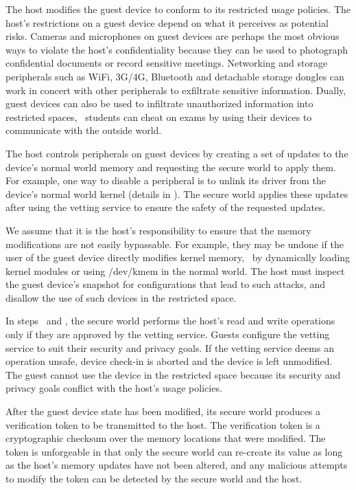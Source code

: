 \begin{mylist}
\item {} The host modifies the guest
device to conform to its restricted usage policies.  The host's restrictions on
a guest device depend on what it perceives as potential risks.  Cameras and
microphones on guest devices are perhaps the most obvious ways to violate the
host's confidentiality because they can be used to photograph confidential
documents or record sensitive meetings. Networking and storage peripherals such
as WiFi, 3G/4G, Bluetooth and detachable storage dongles can work in concert
with other peripherals to exfiltrate sensitive information. Dually, guest
devices can also be used to infiltrate unauthorized information into restricted
spaces, \eg~students can cheat on exams by using their devices to communicate
with the outside world.

The host controls peripherals on guest devices by creating a set of updates to
the device's normal world memory and requesting the secure world to apply them.
For example, one way to disable a peripheral is to unlink its driver from the
device's normal world kernel (details in ).  The secure
world applies these updates after using the vetting service to ensure the
safety of the requested updates.

We assume that it is the host's responsibility to ensure that the memory
modifications are not easily bypassable. For example, they may be undone if the
user of the guest device directly modifies kernel memory, \eg~by dynamically
loading kernel modules or using \textsf{/dev/kmem} in the normal world. The
host must inspect the guest device's snapshot for configurations that lead to
such attacks, and disallow the use of such devices in the restricted space.

In steps \circtwo\ and \circthree, the secure world performs the host's read
and write operations only if they are approved by the vetting service. Guests
configure the vetting service to suit their security and privacy goals. If the
vetting service deems an operation unsafe, device check-in is aborted and the
device is left unmodified. The guest cannot use the device in the restricted
space because its security and privacy goals conflict with the host's usage
policies.

\item {} After the guest
device state has been modified, its secure world produces a verification token
to be transmitted to the host. The verification token is a cryptographic
checksum over the memory locations that were modified. The token is unforgeable
in that only the secure world can re-create its value as long as the host's
memory updates have not been altered, and any malicious attempts to modify the
token can be detected by the secure world and the host.


\end{mylist}
